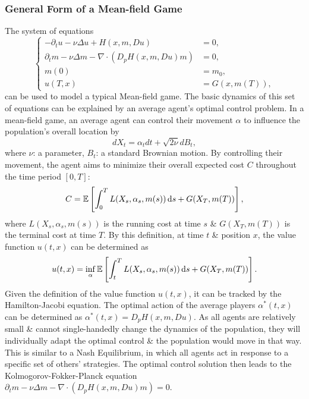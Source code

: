 \documentclass{article}
\begin{document}
\subsubsection{General Form of a Mean-field Game}
The system of equations
\begin{equation*}
	\left\{\begin{split}
		-\partial_tu - \nu\Delta u + H(x,m,Du) &= 0,\\
		\partial_tm - \nu\Delta m - \nabla\cdot(D_pH(x,m,Du)m) &= 0,\\
		m(0) &= m_0,\\
		u(T,x) &= G(x,m(T)),
	\end{split}\right.
\end{equation*}
can be used to model a typical Mean-field game. The basic dynamics of this set of equations can be explained by an average agent's optimal control problem. In a mean-field game, an average agent can control their movement $\alpha$ to influence the population's overall location by
\begin{equation*}
	dX_t = \alpha_tdt + \sqrt{2\nu}dB_t,
\end{equation*}
where $\nu$: a parameter, $B_t$: a standard Brownian motion. By controlling their movement, the agent aims to minimize their overall expected cost $C$ throughout the time period $[0,T]$:
\begin{equation*}
	C = \mathbb{E}\left[\int_0^T L(X_s,\alpha_s,m(s))\,{\rm d}s + G(X_T,m(T))\right],
\end{equation*}
where $L(X_s,\alpha_s,m(s))$ is the running cost at time $s$ \& $G(X_T,m(T))$ is the terminal cost at time $T$. By this definition, at time $t$ \& position $x$, the value function $u(t,x)$ can be determined as
\begin{equation*}
	u(t,x) = \inf_\alpha \mathbb{E}\left[\int_t^T L(X_s,\alpha_s,m(s))\,{\rm d}s + G(X_T,m(T))\right].
\end{equation*}
Given the definition of the value function $u(t,x)$, it can be tracked by the Hamilton-Jacobi equation. The optimal action of the average players $\alpha^*(t,x)$ can be determined as $\alpha^*(t,x) = D_pH(x,m,Du)$. As all agents are relatively small \& cannot single-handedly change the dynamics of the population, they will individually adapt the optimal control \& the population would move in that way. This is similar to a Nash Equilibrium, in which all agents act in response to a specific set of others' strategies. The optimal control solution then leads to the Kolmogorov-Fokker-Planck equation $\partial_tm - \nu\Delta m - \nabla\cdot(D_pH(x,m,Du)m) = 0$.
\end{document}
